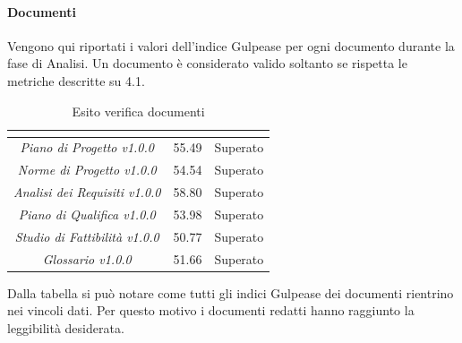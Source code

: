 \paragraph{Documenti} \Spazio
Vengono qui riportati i valori dell'indice Gulpease per ogni documento durante la fase
di Analisi. Un documento è considerato valido soltanto se rispetta le metriche descritte
su 4.1.
\renewcommand{\arraystretch}{1.5}
\begin{table}[H]
\begin{center}
\begin{tabular}{|c|c|c|}
\hline
\rowcolor{title_row}
\textbf{\color{title_text}{Documento}} & \textbf{\color{title_text}{Valore indice}} & \textbf{\color{title_text}{Esito}} \\
\hline
	\emph{Piano di Progetto v1.0.0} & {55.49} & {Superato}\\
\hline
	\emph{Norme di Progetto v1.0.0} & {54.54} & {Superato}\\
\hline
	\emph{Analisi dei Requisiti v1.0.0} & {58.80} & {Superato}\\
\hline
	\emph{Piano di Qualifica v1.0.0} & {53.98} & {Superato}\\
\hline
	\emph{Studio di Fattibilità v1.0.0} & {50.77} & {Superato}\\
\hline
	\emph{Glossario v1.0.0} & {51.66} & {Superato}\\
\hline
\end{tabular}
\caption[Esiti verifica documenti, Analisi]{Esito verifica documenti}
\label{tabella:verifica documenti}
\end{center}
\end{table}
\renewcommand{\arraystretch}{1}

Dalla tabella si può notare come tutti gli indici Gulpease dei documenti rientrino nei vincoli dati. Per questo motivo i documenti redatti hanno raggiunto la leggibilità desiderata.
